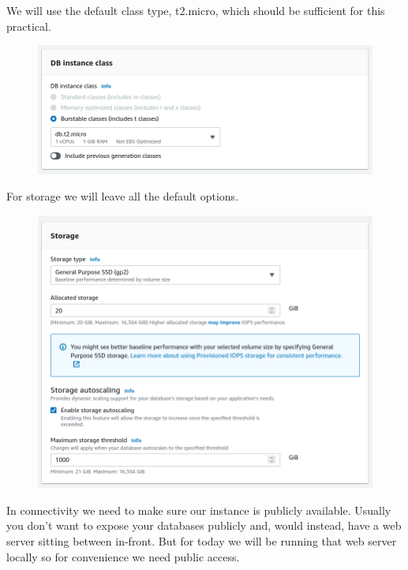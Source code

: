 \documentclass{csse4400}
\begin{document}
We will use the default class type, t2.micro, which should be sufficient for this practical.


\begin{figure}[H]
  \includegraphics[width=\textwidth]{images/db4}
\end{figure}

For storage we will leave all the default options.

\begin{figure}[H]
  \includegraphics[width=\textwidth]{images/db5}
\end{figure}

In connectivity we need to make sure our instance is publicly available.
Usually you don't want to expose your databases publicly and, would instead, have a web server sitting between in-front.
But for today we will be running that web server locally so for convenience we need public access.
\end{document}
